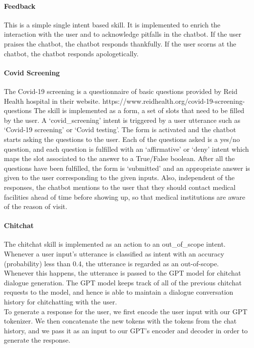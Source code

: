 \documentclass[11pt,a4paper]{article}
\begin{document}
\paragraph{Feedback}
This is a simple single intent based skill. It is implemented to enrich the interaction with the user and to acknowledge pitfalls in the chatbot. If the user praises the chatbot, the chatbot responds thankfully. If the user scorns at the chatbot, the chatbot responds apologetically. 

\paragraph{Covid Screening}
The Covid-19 screening is a questionnaire of basic questions provided by Reid Health hospital in their website. https://www.reidhealth.org/covid-19-screening-questions
The skill is implemented as a form, a set of slots that need to be filled by the user. A `covid\_screening' intent is triggered by a user utterance such as `Covid-19 screening' or `Covid testing'. The form is activated and the chatbot starts asking the questions to the user. Each of the questions asked is a yes/no question, and each question is fulfilled with an `affirmative' or `deny' intent which maps the slot associated to the answer to a True/False boolean. After all the questions have been fulfilled, the form is `submitted' and an appropriate answer is given to the user corresponding to the given inputs. Also, independent of the responses, the chatbot mentions to the user that they should contact medical facilities ahead of time before showing up, so that medical institutions are aware of the reason of visit.

\paragraph{Chitchat}
The chitchat skill is implemented as an action to an out\_of\_scope intent. Whenever a user input's utterance is classified as intent with an accuracy (probability) less than 0.4, the utterance is regarded as an out-of-scope. Whenever this happens, the utterance is passed to the GPT model for chitchat dialogue generation. The GPT model keeps track of all of the previous chitchat requests to the model, and hence is able to maintain a dialogue conversation history for chitchatting with the user. \\
To generate a response for the user, we first encode the user input with our GPT tokenizer. We then concatenate the new tokens with the tokens from the chat history, and we pass it as an input to our GPT's encoder and decoder in order to generate the response.
\end{document}
